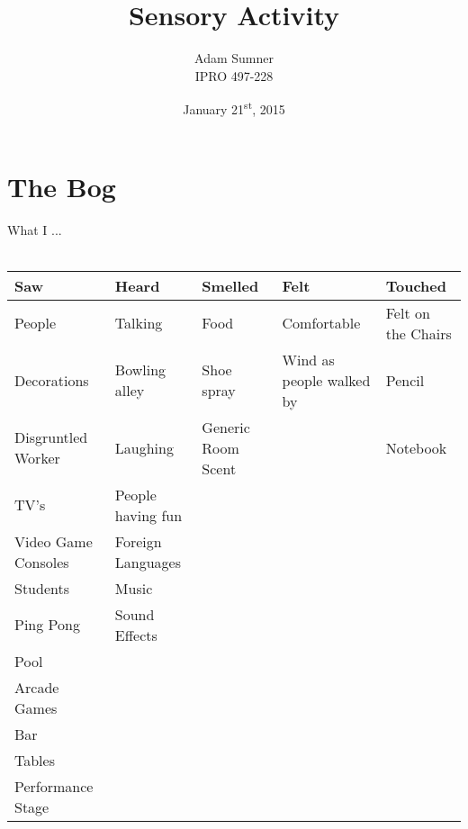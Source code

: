 \documentclass[12pt]{article}
\title{\textbf{Sensory Activity}}
\author{Adam Sumner \\ IPRO 497-228}
\date{January 21\textsuperscript{st}, 2015}
\begin{document}
\maketitle

\section*{The Bog}
What I ...
\\
~\\
	\begin{tabularx}{\linewidth}{||>{\centering\arraybackslash}X||>{\centering\arraybackslash}X||>{\centering\arraybackslash}X||>{\centering\arraybackslash}X||>{\centering\arraybackslash}X||}
		\hline
		\textbf{Saw} & \textbf{Heard} & \textbf{Smelled} & \textbf{Felt} & \textbf{Touched} \\ \hline \hline
		People & Talking  & Food  & Comfortable  & Felt on the Chairs \\ \hline
		Decorations & Bowling alley & Shoe spray  & Wind as people walked by  & Pencil \\ \hline
		Disgruntled Worker & Laughing & Generic Room Scent &  & Notebook \\ \hline
		TV's & People having fun &  &  &  \\ \hline
		Video Game Consoles &  Foreign Languages &  &  &  \\ \hline
		Students &  Music &  &  &  \\ \hline	
		Ping Pong & Sound Effects &  &  &  \\ \hline
		Pool &  &  &  &  \\ \hline
		Arcade Games &  &  &  &  \\ \hline
		Bar &  &  &  &  \\ \hline
		Tables &  &  &  &  \\ \hline
		 Performance Stage&  &  &  &  \\ \hline \hline
		
		
	\end{tabularx}
\end{document}
